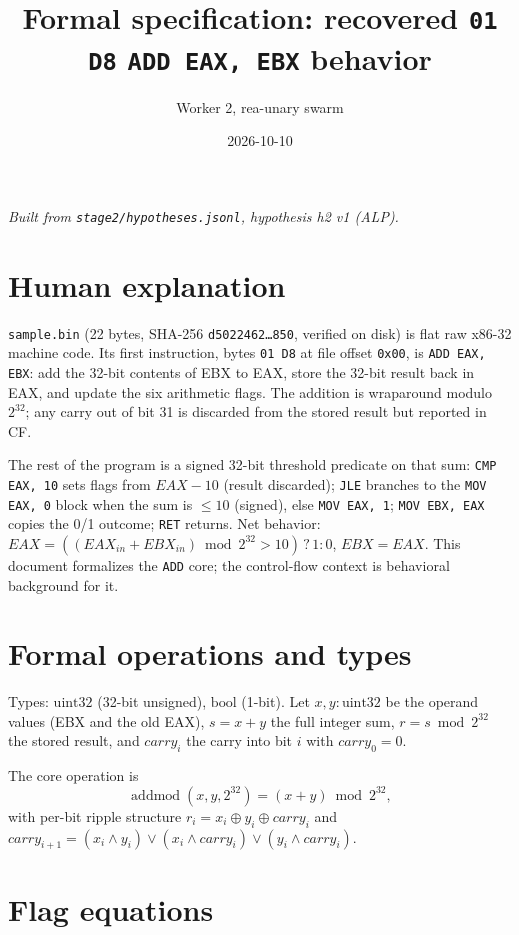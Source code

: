 \documentclass[11pt]{article}
\title{Formal specification: recovered \texttt{01 D8} \texttt{ADD EAX, EBX} behavior}
\author{Worker 2, rea-unary swarm}
\date{2026-10-10}
\begin{document}
\maketitle

\noindent\textit{Built from \texttt{stage2/hypotheses.jsonl}, hypothesis h2 v1 (ALP).}

\section{Human explanation}

\texttt{sample.bin} (22 bytes, SHA-256
\texttt{d5022462\ldots850}, verified on disk) is flat raw x86-32 machine code.
Its first instruction, bytes \texttt{01 D8} at file offset \texttt{0x00}, is
\texttt{ADD EAX, EBX}: add the 32-bit contents of EBX to EAX, store the
32-bit result back in EAX, and update the six arithmetic flags. The addition
is wraparound modulo $2^{32}$; any carry out of bit 31 is discarded from the
stored result but reported in CF.

The rest of the program is a signed 32-bit threshold predicate on that sum:
\texttt{CMP EAX, 10} sets flags from $EAX - 10$ (result discarded);
\texttt{JLE} branches to the \texttt{MOV EAX, 0} block when the sum is
$\le 10$ (signed), else \texttt{MOV EAX, 1}; \texttt{MOV EBX, EAX} copies the
0/1 outcome; \texttt{RET} returns. Net behavior:
$EAX = ((EAX_{in} + EBX_{in}) \bmod 2^{32} > 10) \,?\, 1 : 0$, $EBX = EAX$.
This document formalizes the \texttt{ADD} core; the control-flow context is
behavioral background for it.

\section{Formal operations and types}

Types: $\mathrm{uint32}$ (32-bit unsigned), $\mathrm{bool}$ (1-bit).
Let $x, y : \mathrm{uint32}$ be the operand values (EBX and the old EAX),
$s = x + y$ the full integer sum, $r = s \bmod 2^{32}$ the stored result,
and $carry_i$ the carry into bit $i$ with $carry_0 = 0$.

The core operation is
\[
\operatorname{addmod}(x, y, 2^{32}) = (x + y) \bmod 2^{32},
\]
with per-bit ripple structure
$r_i = x_i \oplus y_i \oplus carry_i$ and
$carry_{i+1} = (x_i \land y_i) \lor (x_i \land carry_i) \lor (y_i \land carry_i)$.

\section{Flag equations}
\end{document}
